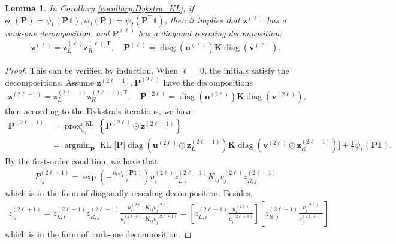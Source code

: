 \documentclass[11pt]{book}
\newtheorem{lemma}[theorem]{Lemma}
\begin{document}
\begin{lemma}
In Corollary \ref{corollary:Dykstra_KL}, if $\phi_1(\mathbf{P}) = \psi_1(\mathbf{P}\mathbb{1}),
    \phi_2(\mathbf{P}) = \psi_2(\mathbf{P}^{\mathrm{T}}\mathbb{1})$, then it implies that $\mathbf{z}^{(\ell)}$ has a rank-one decomposition, and $\mathbf{P}^{(\ell)}$ has a diagonal rescaling decomposition:
\begin{align}
    \mathbf{z}^{(\ell)} = \mathbf{z}_L^{(\ell)} \mathbf{z}_R^{(\ell),\mathrm{T}}, \quad
    \mathbf{P}^{(\ell)} = \operatorname{diag}(\mathbf{u}^{(\ell)})\mathbf{K} \operatorname{diag}(\mathbf{v}^{(\ell)}).
\end{align}
\end{lemma}
\begin{proof}
This can be verified by induction. When $\ell = 0$, the initials satisfy the decompositions. Assume $\mathbf{z}^{(2\ell-1)}, \mathbf{P}^{(2\ell)}$ have the decompositions
\begin{align*}
    \mathbf{z}^{(2\ell-1)} = \mathbf{z}_L^{(2\ell-1)} \mathbf{z}_R^{(2\ell-1),\mathrm{T}}, \quad
    \mathbf{P}^{(2\ell)} = \operatorname{diag}(\mathbf{u}^{(2\ell)})\mathbf{K} \operatorname{diag}(\mathbf{v}^{(2\ell)}),
\end{align*}
then according to the Dykstra's iterations, we have
\begin{align*}
    \mathbf{P}^{(2\ell+1)} &= \operatorname{prox}^{\epsilon\operatorname{KL}}_{\phi_1} \left\{ \mathbf{P}^{(2\ell)} \odot \mathbf{z}^{(2\ell-1)} \right\} \\ 
    &=\operatorname{argmin}_{\mathbf{P}} \operatorname{KL} \Big[ \mathbf{P} \Big| \operatorname{diag}(\mathbf{u}^{(2\ell)}\odot\mathbf{z}_L^{(2\ell-1)})\mathbf{K} \operatorname{diag}(\mathbf{v}^{(2\ell)}\odot\mathbf{z}_R^{(2\ell-1)}) \Big] + \frac{1}{\epsilon}\psi_1(\mathbf{P}\mathbb{1}).
\end{align*}
By the first-order condition, we have that
\begin{align*}
    P_{ij}^{(2\ell+1)} = \exp\left(-\frac{\partial_i\psi_1(\mathbf{P}\mathbb{1})}{\epsilon}\right)u_i^{(2\ell)} z_{L,i}^{(2\ell-1)}K_{ij}v_j^{(2\ell)} z_{R,j}^{(2\ell-1)}
\end{align*}
which is in the form of diagonally rescaling decomposition. Besides, 
\begin{align*}
    z_{ij}^{(2\ell+1)} = z_{L,i}^{(2\ell-1)}z_{R,j}^{(2\ell-1)}\frac{u_i^{(2\ell)}K_{ij}v_j^{(2\ell)}}{u_i^{(2\ell+1)}K_{ij}v_j^{(2\ell+1)}}
    = \left[ z_{L,i}^{(2\ell-1)} \frac{u_i^{(2\ell)}}{u_i^{(2\ell+1)}}\right]
    \left[ z_{R,j}^{(2\ell-1)} \frac{v_j^{(2\ell)}}{v_j^{(2\ell+1)}}\right]
\end{align*}
which is in the form of rank-one decomposition.
\end{proof}
\end{document}
